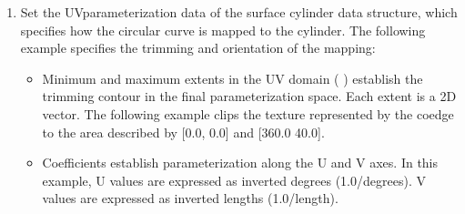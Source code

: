 \documentclass[letterpaper,12pt,english,openany,oneside]{sphinxmanual}
\begin{document}
\begin{sphinxVerbatim}[commandchars=\\\{\}]
 
\end{sphinxVerbatim}
\begin{enumerate}
%
\setcounter{enumi}{2}
\item {} 
Set the UV\sphinxhyphen{}parameterization data of the surface cylinder data structure, which specifies how the circular curve is mapped to the cylinder. The following example specifies the trimming and orientation of the mapping:
\begin{itemize}
\item {} 
Minimum and maximum extents in the UV domain ( ) establish the trimming contour in the final parameterization space. Each extent is a 2D vector. The following example clips the texture represented by the co\sphinxhyphen{}edge to the area described by {[}0.0, 0.0{]} and {[}360.0 40.0{]}.

\item {} 
Coefficients establish parameterization along the U and V axes. In this example, U values are expressed as inverted degrees (1.0/degrees). V values are expressed as inverted lengths (1.0/length).

\end{itemize}

\end{enumerate}
\end{document}
